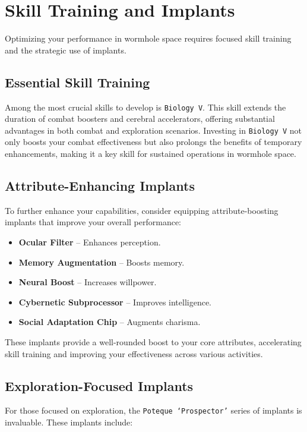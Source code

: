 \documentclass[a4paper,12pt]{article}
\begin{document}
\section{Skill Training and Implants}

Optimizing your performance in wormhole space requires focused skill training and the strategic use of implants.

\subsection{Essential Skill Training}

Among the most crucial skills to develop is \texttt{Biology V}. This skill extends the duration of combat boosters and cerebral accelerators, offering substantial advantages in both combat and exploration scenarios. Investing in \texttt{Biology V} not only boosts your combat effectiveness but also prolongs the benefits of temporary enhancements, making it a key skill for sustained operations in wormhole space.

\subsection{Attribute-Enhancing Implants}

To further enhance your capabilities, consider equipping attribute-boosting implants that improve your overall performance:

\begin{itemize}
    \item \textbf{Ocular Filter} – Enhances perception.
    \item \textbf{Memory Augmentation} – Boosts memory.
    \item \textbf{Neural Boost} – Increases willpower.
    \item \textbf{Cybernetic Subprocessor} – Improves intelligence.
    \item \textbf{Social Adaptation Chip} – Augments charisma.
\end{itemize}

These implants provide a well-rounded boost to your core attributes, accelerating skill training and improving your effectiveness across various activities.

\subsection{Exploration-Focused Implants}

For those focused on exploration, the \texttt{Poteque ‘Prospector’} series of implants is invaluable. These implants include:
\end{document}
